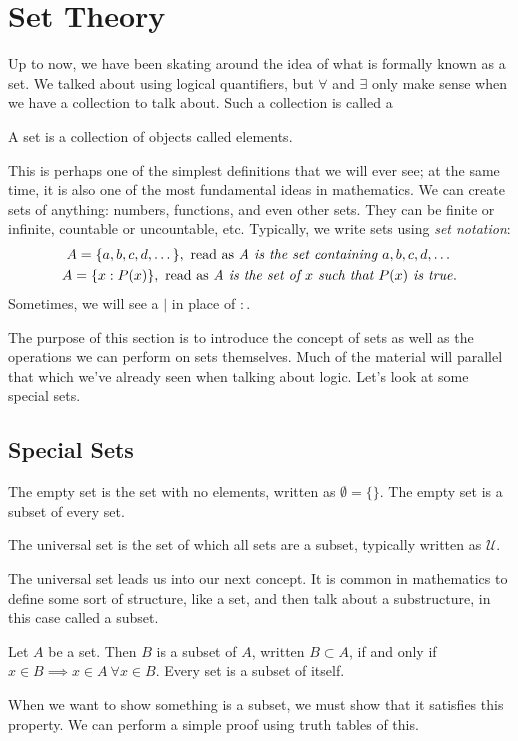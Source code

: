 \section{Set Theory}
Up to now, we have been skating around the idea of what is formally known as a set. We talked about using logical quantifiers, but $\forall$ and $\exists$ only make sense when we have a collection to talk about. Such a collection is called a

\begin{definition}{}
	A set is a collection of objects called elements.
\end{definition}

This is perhaps one of the simplest definitions that we will ever see; at the same time, it is also one of the most fundamental ideas in mathematics. We can create sets of anything: numbers, functions, and even other sets. They can be finite or infinite, countable or uncountable, etc. Typically, we write sets using \textit{set notation}:
\begin{gather*}
	A = \{a,b,c,d,\dots\},\text{ read as \textit{A is the set containing $a,b,c,d,\dots$}}\\
	A = \{x : P(x)\},\text{ read as \textit{A is the set of $x$ such that $P(x)$ is true}}.
\end{gather*}
Sometimes, we will see a $|$ in place of $:$.

The purpose of this section is to introduce the concept of sets as well as the operations we can perform on sets themselves. Much of the material will parallel that which we've already seen when talking about logic. Let's look at some special sets.

\subsection*{Special Sets}

\begin{definition}{}
	The empty set is the set with no elements, written as $\emptyset=\{\}$. The empty set is a subset of every set.
\end{definition}
\begin{definition}{}
	The universal set is the set of which all sets are a subset, typically written as $\mathcal{U}$.
\end{definition}
The universal set leads us into our next concept. It is common in mathematics to define some sort of structure, like a set, and then talk about a substructure, in this case called a subset.
\begin{definition}{}
	Let $A$ be a set. Then $B$ is a subset of $A$, written $B\subset A$, if and only if $x\in B\implies x\in A\ \forall x\in B$. Every set is a subset of itself.
\end{definition}
When we want to show something is a subset, we must show that it satisfies this property. We can perform a simple proof using truth tables of this.


